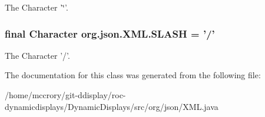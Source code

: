 The Character '\char`\"{}'. \hypertarget{classorg_1_1json_1_1XML_aaa9a255bc94655b02d65b2c8525e5188}{
\subsubsection[{S\-L\-A\-S\-H}]{\setlength{\rightskip}{0pt plus 5cm}final Character org.\-json.\-X\-M\-L.\-S\-L\-A\-S\-H = '/'\hspace{0.3cm}{\ttfamily [static]}}}\label{classorg_1_1json_1_1XML_aaa9a255bc94655b02d65b2c8525e5188}
The Character '/'. 

The documentation for this class was generated from the following file\-:\begin{DoxyCompactItemize}
\item 
/home/mccrory/git-\/ddisplay/roc-\/dynamicdisplays/\-Dynamic\-Displays/src/org/json/X\-M\-L.\-java\end{DoxyCompactItemize}
